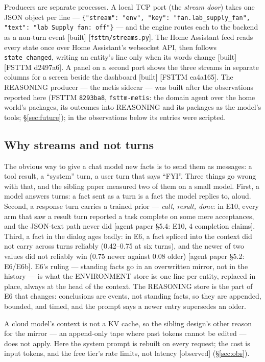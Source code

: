 \documentclass[11pt]{article}
\newcommand{\src}[1]{{\footnotesize\textsf{[#1]}}}
\newcommand{\built}{\textsf{\small[built]}}
\newcommand{\observed}{\textsf{\small[observed]}}
\begin{document}
Producers are separate processes. A local TCP port (the \emph{stream door}) takes one JSON
object per line --- \texttt{\{"stream": "env", "key": "fan.lab\_supply\_fan", "text": "lab
Supply fan: off"\}} --- and the engine routes each to the backend as a non-turn event
\built{} \src{\texttt{fsttm/streams.py}}. The Home Assistant feed reads every state once over
Home Assistant's websocket API, then follows \texttt{state\_changed}, writing an entity's line
only when its words change \built{} \src{FSTTM d2497a6}. A panel on a second port shows the
three streams in separate columns for a screen beside the dashboard \built{} \src{FSTTM
ea4a165}. The REASONING producer --- the metis sidecar --- was built after the observations reported here (FSTTM \texttt{8293ba8}, \texttt{fsttm-metis}: the domain agent over the home world's packages, its outcomes into REASONING and its packages as the model's tools; \S\ref{sec:future});
in the observations below its entries were scripted.

\subsection{Why streams and not turns}

The obvious way to give a chat model new facts is to send them as messages: a tool result, a
``system'' turn, a user turn that says ``FYI''. Three things go wrong with that, and the
sibling paper measured two of them on a small model. First, a model answers turns: a fact
sent as a turn is a fact the model replies to, aloud. Second, a response turn carries a
trained prior --- \emph{call, result, done}: in E10, every arm that saw a result turn
reported a task complete on some mere acceptances, and the JSON-text path never did
\src{agent paper \S5.4: E10, 4 completion claims}. Third, a fact in the dialog
ages badly: in E6, a fact spliced into the context did not carry across turns reliably
(0.42--0.75 at six turns), and the newer of two values did not reliably win (0.75 newer
against 0.08 older) \src{agent paper \S5.2: E6/E6b}. E6's ruling --- standing facts go in an
overwritten mirror, not in the history --- is what the ENVIRONMENT store is: one line per
entity, replaced in place, always at the head of the context. The REASONING store is the
part of E6 that changes: conclusions are events, not standing facts, so they are appended,
bounded, and timed, and the prompt says a newer entry supersedes an older.

A cloud model's context is not a KV cache, so the sibling design's other reason for the
mirror --- an append-only tape where past tokens cannot be edited --- does not apply. Here
the system prompt is rebuilt on every request; the cost is input tokens, and the free tier's
rate limits, not latency \observed{} (\S\ref{sec:obs}).
\end{document}
